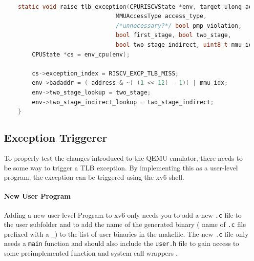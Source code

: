 \begin{lstlisting}[language=c,float=h!,
    caption={Setup-Code for raising a TLB Exception. The \texttt{cs-\textgreater exception\_index} variable needs
    to be set to the custom \texttt{TLB Exception} enum value. The \texttt{env-\textgreater badaddr} variable
    will end up in the \texttt{mtval} register. The address will be page-aligned first, by zeroing out the
    lowest 12 bits. This is used to encode the \texttt{mmu\_idx} into the faulting address. Why this is
    necessary is explained in Section \ref{sect:tlbwrite}},
    label={lst:exceptionThrow}]

    static void raise_tlb_exception(CPURISCVState *env, target_ulong address,
                                MMUAccessType access_type,
                                /*unnecessary?*/ bool pmp_violation,
                                bool first_stage, bool two_stage,
                                bool two_stage_indirect, uint8_t mmu_idx) {
        CPUState *cs = env_cpu(env);

        cs->exception_index = RISCV_EXCP_TLB_MISS;
        env->badaddr = ( address & ~( (1 << 12) - 1)) | mmu_idx;
        env->two_stage_lookup = two_stage;
        env->two_stage_indirect_lookup = two_stage_indirect;
    }

\end{lstlisting}



\subsection{Exception Triggerer}
To properly test the changes introduced to the QEMU emulator, there needs to be some way to
trigger a TLB exception.
By implementing this as a user-level program, the exception can be triggered using the xv6 shell.

\paragraph{New User Program} Adding a new user-level Program to xv6 only needs you to add a new \texttt{.c} file to the user subfolder
and to add the name of the generated binary ( name of \texttt{.c} file prefixed with a \texttt{\_})
to the list of user binaries in the makefile.
The new \texttt{.c} file only needs a \texttt{main} function and should also include the \texttt{user.h}
file to gain access to some preimplemented function and system call wrappers \cite{xv6source}.

